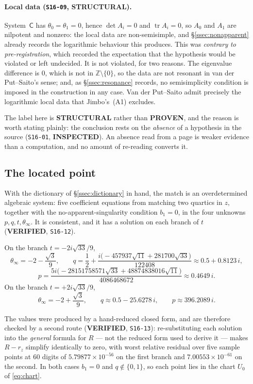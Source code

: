 \paragraph{Local data (\texttt{S16-09}, \textbf{STRUCTURAL}).}
System~$\mathsf C$ has $\theta_0=\theta_1=0$, hence $\det A_i=0$ and
$\operatorname{tr}A_i=0$, so $A_0$ and $A_1$ are nilpotent and nonzero: the
local data are non-semisimple, and \S\ref{ssec:nonapparent} already records the
logarithmic behaviour this produces. This was \emph{contrary to
pre-registration}, which recorded the expectation that the hypothesis would be
violated or left undecided. It is not violated, for two reasons. The eigenvalue
difference is $0$, which is not in $\mathbb Z\setminus\{0\}$, so the data are
not resonant in van der Put--Saito's sense; and, as \S\ref{ssec:resonance}
records, no semisimplicity condition is imposed in the construction in any
case. Van der Put--Saito admit precisely the logarithmic local data that
Jimbo's~(A1) excludes.

The label here is \textbf{STRUCTURAL} rather than \textbf{PROVEN}, and the
reason is worth stating plainly: the conclusion rests on the \emph{absence} of
a hypothesis in the source (\texttt{S16-01}, \textbf{INSPECTED}). An absence
read from a page is weaker evidence than a computation, and no amount of
re-reading converts it.

\subsection{The located point}\label{ssec:located}

With the dictionary of \S\ref{ssec:dictionary} in hand, the match is an
overdetermined algebraic system: five coefficient equations from matching two
quartics in $z$, together with the no-apparent-singularity condition $b_1=0$,
in the four unknowns $p,q,t,\theta_\infty$. It is consistent, and it has a
solution on each branch of $t$ (\textbf{VERIFIED}, \texttt{S16-12}).

On the branch $t=-2i\sqrt{33}/9$,
\[
  \theta_\infty=-2-\frac{\sqrt3}{9},\qquad
  q=\frac12+\frac{i\bigl(-457937\sqrt{11}+281700\sqrt{33}\bigr)}{122408}
   \approx 0.5+0.8123\,i,
\]
\[
  p=\frac{5i\bigl(-28151758571\sqrt{33}+48874838016\sqrt{11}\bigr)}
         {4086468672}\approx 0.4649\,i .
\]
On the branch $t=+2i\sqrt{33}/9$,
\[
  \theta_\infty=-2+\frac{\sqrt3}{9},\qquad
  q\approx 0.5-25.6278\,i,\qquad p\approx 396.2089\,i .
\]

The values were produced by a hand-reduced closed form, and are therefore
checked by a second route (\textbf{VERIFIED}, \texttt{S16-13}): re-substituting
each solution into the \emph{general} formula for $R$ --- not the reduced form
used to derive it --- makes $R-r_z$ simplify identically to zero, with worst
relative residual over five sample points at $60$ digits of
$5.79877\times10^{-56}$ on the first branch and $7.00553\times10^{-61}$ on the
second. In both cases $b_1=0$ and $q\notin\{0,1\}$, so each point lies in the
chart $U_0$ of \eqref{eq:chart}.

